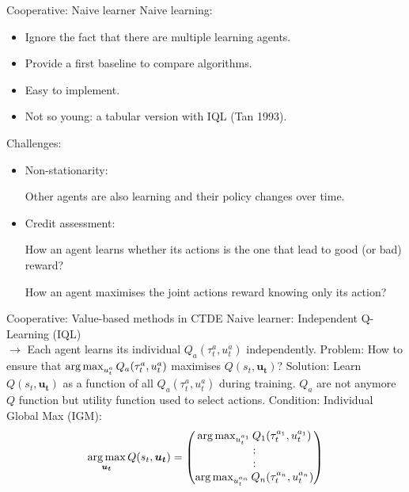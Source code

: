 \documentclass[9pt, hyperref={pdfusetitle,colorlinks=true,allcolors=DarkBlue}]{beamer}
\begin{document}
\begin{frame}{Cooperative: Naive learner}
Naive learning:
\begin{itemize}
    \item Ignore the fact that there are multiple learning agents.
    \item Provide a first baseline to compare algorithms.
    \item Easy to implement.
    \item Not so young: a tabular version with IQL (Tan 1993).
\end{itemize}
\vfill
Challenges:
\pause
\begin{itemize}
\item Non-stationarity:

Other agents are also learning and their policy changes over time.

\item Credit assessment: 

How an agent learns whether its actions is the one that lead to good (or bad) reward?

How an agent maximises the joint actions reward knowing only its action?

\end{itemize}
\end{frame}

\begin{frame}{Cooperative: Value-based methods in CTDE}
Naive learner: Independent Q-Learning (IQL)\\
$\rightarrow$ Each agent learns its individual $Q_a(\tau^a_t, u^a_t)$ independently.
\vfill
Problem:
How to ensure that $\operatorname*{arg\,max}_{u^a_t} Q_a(\tau^a_t, u^a_t)$ maximises $Q(s_t, \bm{u_t})$?
\vfill
\pause
Solution: Learn $Q(s_t, \bm{u_t})$ as a function of all $Q_a(\tau^a_t, u^a_t)$ during training.
\vfill
$Q_a$ are not anymore $Q$ function but utility function used to select actions.
\vfill
Condition: Individual Global Max (IGM):
\begin{equation*}
    \operatorname*{arg\,max}_{\bm{u_t}} Q(s_t, \bm{u_t}) = 
    \begin{pmatrix}
    \operatorname*{arg\,max}_{u^{a_1}_t} Q_1(\tau^{a_1}_t, u^{a_1}_t) \\
    : \\
    : \\
    \operatorname*{arg\,max}_{u^{a_n}_t} Q_n(\tau^{a_n}_t, u^{a_n}_t)
    \end{pmatrix}
\end{equation*}

\end{frame}
\end{document}
